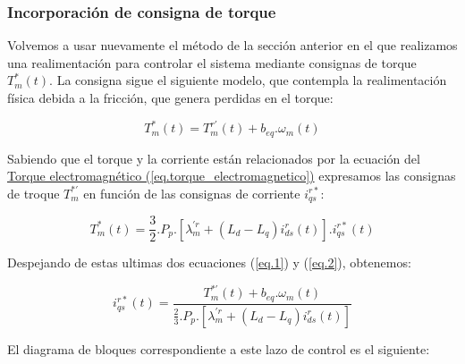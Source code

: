 \documentclass{article}
\begin{document}

\subsubsection{Incorporación de consigna de torque}

Volvemos a usar nuevamente el método de la sección anterior en el que realizamos una realimentación
para controlar el sistema mediante consignas de torque $T_m^*(t)$. La consigna sigue el siguiente modelo,
que contempla la realimentación física debida a la fricción, que genera perdidas en el torque:

\begin{equation}\label{eq.1}
    T_m^*(t) = T_m^{r\prime}(t) + b_{eq}.\omega_m(t)
\end{equation}

Sabiendo que el torque y la corriente están relacionados por la ecuación del
\hyperref[eq.torque_electromagnetico]{Torque electromagnético (\ref*{eq.torque_electromagnetico})}
expresamos las consignas de troque $T_m^{*\prime}$ en función de las consignas de corriente $i_{qs}^{r*}$:

\begin{equation}\label{eq.2}
    T_m^{*}(t) = \frac{3}{2}.P_p.[\lambda_m^{\prime r} + (L_d - L_q)i_{ds}^{r}(t)].i_{qs}^{r*}(t)
\end{equation}

Despejando de estas ultimas dos ecuaciones (\ref{eq.1}) y (\ref{eq.2}), obtenemos:

\begin{equation}
    i_{qs}^{r*}(t) = \frac{T_m^{*\prime}(t) + b_{eq}.\omega_m(t)}{\frac{2}{3}.P_p.[\lambda_m^{\prime r} + (L_d - L_q)i_{ds}^{r}(t)]}
\end{equation}


El diagrama de bloques correspondiente a este lazo de control es el siguiente:
\end{document}
